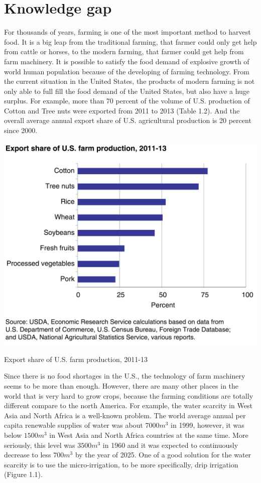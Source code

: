 \documentclass[letterpaper,12pt,oneside]{book}
\begin{document}
		
		\section{Knowledge gap}
		For thousands of years, farming is one of the most important method to harvest food. It is a big leap from the traditional farming, that farmer could only get help from cattle or horses, to the modern farming, that farmer could get help from farm machinery. It is possible to satisfy the food demand of explosive growth of world human population because of the developing of farming technology. From the current situation in the United States, the products of modern farming is not only able to full fill the food demand of the United States, but also have a huge surplus. For example, more than 70 percent of the volume of U.S. production of Cotton and Tree nuts were exported from 2011 to 2013 (Table 1.2). And the overall average annual export share of U.S. agricultural production is 20 percent since 2000. \cite{Exports}
		\begin{table}[ht!]
			\begin{center}
				\includegraphics[scale = 0.4]{cropexport.png}
				\caption{Export share of U.S. farm production, 2011-13}
			\end{center}
		\end{table}
		Since there is no food shortages in the U.S., the technology of farm machinery seems to be more than enough. However, there are many other places in the world that is very hard to grow crops, because the farming conditions are totally different compare to the north America. For example, the water scarcity in West Asia and North Africa is a well-known problem. The world average annual per capita renewable supplies of water was about $7000 m^{3}$ in 1999, however, it was below $1500 m^{3}$ in West Asia and North Africa countries at the same time. More seriously, this level was $3500 m^{3}$ in 1960 and it was expected to continuously decrease to less $700 m^{3}$ by the year of 2025. \cite{margat1999water} One of a good solution for the water scarcity is to use the micro-irrigation, to be more specifically, drip irrigation (Figure 1.1). 
\end{document}
